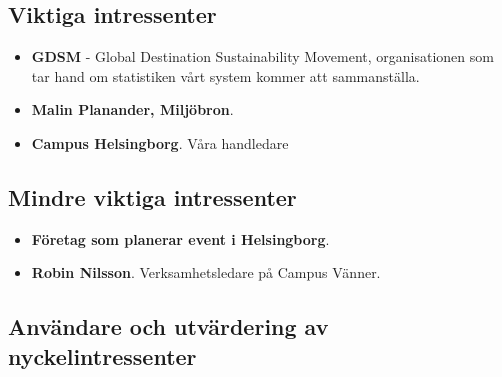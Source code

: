 \documentclass[12pt]{article}
\begin{document}
    \subsection{Viktiga intressenter}
        \begin{itemize}
            \item \textbf{GDSM} - Global Destination Sustainability Movement, organisationen som tar hand om statistiken vårt system kommer att sammanställa.
             \\
            \item \textbf{Malin Planander, Miljöbron}.
            \\
            \item \textbf{Campus Helsingborg}. Våra handledare
        \end{itemize}
        
    \subsection{Mindre viktiga intressenter}
    \begin{itemize}
            \item \textbf{Företag som planerar event i Helsingborg}.
                \\
            \item \textbf{Robin Nilsson}. Verksamhetsledare på Campus Vänner.
            
    \end{itemize}
    
    \subsection{Användare och utvärdering av nyckelintressenter}
    
\end{document}
